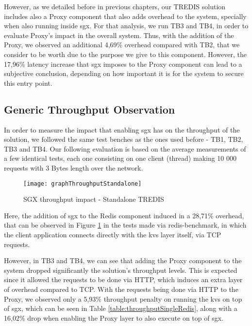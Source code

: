However, as we detailed before in previous chapters, our TREDIS solution includes also a Proxy component that also adds overhead to the system, specially when also running inside \gls{sgx}. For that analysis, we run TB3 and TB4, in order to evaluate Proxy's impact in the overall system. Thus, with the addition of the Proxy, we observed an additional 4,69\% overhead compared with TB2, that we consider to be worth due to the purpose we give to this component. However, the 17,96\% latency increase that \gls{sgx} imposes to the Proxy component can lead to a subjective conclusion, depending on how important it is for the system to secure this entry point.

\subsection{Generic Throughput Observation}

In order to measure the impact that enabling \gls{sgx} has on the throughput of the solution, we followed the same test benches as the ones used before - TB1, TB2, TB3 and TB4. Our following evaluation is based on the average measurements of a few identical tests, each one consisting on one client (thread) making 10 000 requests with 3 Bytes length over the network.

\begin{figure}[htbp]
	\centering
	{\texttt{[image: graphThroughputStandalone]}}
	\caption{SGX throughput impact - Standalone TREDIS}
	\label{fig:graphThroughputStandalone}
\end{figure}

Here, the addition of \gls{sgx} to the Redis component induced in a 28,71\% overhead, that can be observed in Figure \ref{fig:graphThroughputStandalone} in the tests made via redis-benchmark, in which the client application connects directly with the \gls{kvs} layer itself, via TCP requests. 

However, in TB3 and TB4, we can see that adding the Proxy component to the system dropped significantly the solution's throughput levels. This is expected since it allowed the requests to be done via HTTP, which induces an extra layer of overhead compared to TCP. With the requests being done via HTTP to the Proxy, we observed only a 5,93\% throughput penalty on running the \gls{kvs} on top of \gls{sgx}, which can be seen in Table \ref{table:throughputSingleRedis}, along with a 16,02\% drop when enabling the Proxy layer to also execute on top of \gls{sgx}.


